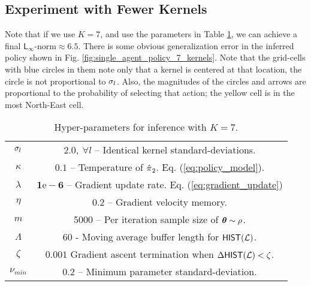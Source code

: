  	\begin{figure}[H]
	\begin{center}
	\end{center}
	\end{figure}

    \subsection{Experiment with Fewer Kernels}

	Note that if we use $K=7$, and use the parameters in Table \ref{table:single_agent_new_hyper_params}, we can achieve a final
$\mathsf{L}_{\infty}\text{-norm} \approx 6.5$. There is some obvious generalization error in the inferred policy shown in Fig. \ref{fig:single_agent_policy_7_kernels}. Note that the grid-cells with blue circles in them note only that a kernel is centered at that location, the circle is not proportional to $\sigma_{l}$. Also, the magnitudes of the circles and arrows are proportional to the probability of selecting that action; the yellow cell is in the most North-East cell.

    \begin{table}[H]
        \centering
        \begin{tabular}{c|c}
                $\sigma_{l}$ & $\mathbf{2.0},\ \forall l$ -- Identical kernel standard-deviations.\\
                $\kappa$ & $0.1$ -- Temperature of $\hat{\pi_{}}_2$. Eq. (\ref{eq:policy_model}). \\
                $\lambda$ & $\mathbf{1\mathrm{e}\!-\!6}$ -- Gradient update rate. Eq. (\ref{eq:gradient_update}) \\
                $\eta$ & $\mathbf{0.2}$ -- Gradient velocity memory.\\
                $m$ & 5000 -- Per iteration sample size of $\boldsymbol{\mathbb{\theta}}\sim \rho$.\\
                $\Lambda$ & $60$ - Moving average buffer length for $\mathsf{HIST}(\mathcal{L})$. \\
                $\zeta$ & $0.001$ Gradient ascent termination when $\Delta\mathsf{HIST}(\mathcal{L}) < \zeta$.\\
                $\nu_{min}$ & $0.2$ -- Minimum parameter standard-deviation.\\
        \end{tabular}
        \caption{Hyper-parameters for inference with $K=7$.}
        \label{table:single_agent_new_hyper_params}
    \end{table}

